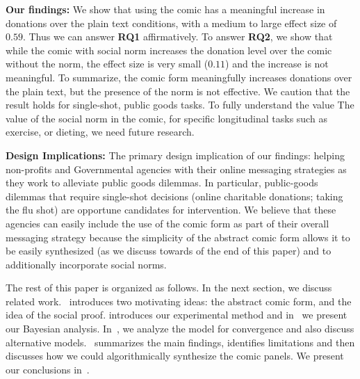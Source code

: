 \textbf{Our findings:} We show that using the comic has a meaningful increase in donations over the plain text conditions, with a medium to large effect size of $0.59$. Thus we can answer \textbf{RQ1} affirmatively. To answer \textbf{RQ2}, we show that while the comic with social norm increases the donation level over the comic without the norm, the effect size is very small ($0.11$) and the increase is not meaningful. To summarize, the comic form meaningfully increases donations over the plain text, but the presence of the norm is not effective. We caution that the result holds for single-shot, public goods tasks. To fully understand the value
The value of the social norm in the comic, for specific longitudinal tasks such as exercise, or dieting, we need future research.  

\textbf{Design Implications:} The primary design implication of our findings: helping non-profits and Governmental agencies with their online messaging strategies as they work to alleviate public goods dilemmas. In particular, public-goods dilemmas that require single-shot decisions (online charitable donations; taking the flu shot) are opportune candidates for intervention. We believe that these agencies can easily include the use of the comic form as part of their overall messaging strategy because the simplicity of the abstract comic form allows it to be easily synthesized (as we discuss towards of the end of this paper) and to additionally incorporate social norms. 


The rest of this paper is organized as follows. In the next section, we discuss related work.~ introduces two motivating ideas: the abstract comic form, and the idea of the social proof. introduces our experimental method and in~ we present our Bayesian analysis. In~, we analyze the model for convergence and also discuss alternative models.~ summarizes the main findings, identifies limitations and then discusses how we could algorithmically synthesize the comic panels. We present our conclusions in~. 
